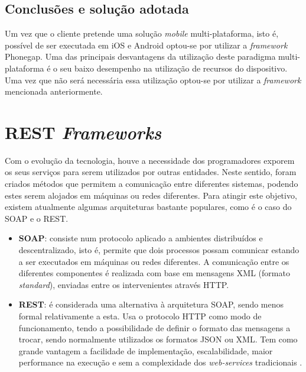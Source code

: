 \subsection{Conclusões e solução adotada}



Um vez que o cliente pretende uma solução \textit{mobile} multi-plataforma, isto é, possível de ser executada em iOS e Android optou-se por utilizar a \textit{framework} Phonegap.  Uma das principais desvantagens da utilização deste paradigma multi-plataforma é o seu baixo desempenho na utilização de recursos do dispositivo. Uma vez que não será necessária essa utilização optou-se por utilizar a \textit{framework} mencionada anteriormente. 



\newpage
\section{REST \textit{Frameworks}}


Com o evolução da tecnologia, houve a necessidade dos programadores exporem os seus serviços para serem utilizados por outras entidades. Neste sentido, foram criados métodos que permitem a comunicação  entre diferentes sistemas, podendo estes serem alojados em máquinas ou redes diferentes. Para atingir este objetivo, existem atualmente algumas arquiteturas bastante populares, como é o caso do \ac{SOAP} e o \ac{REST}. 


\begin{itemize}
	\item \textbf{\ac{SOAP}}: consiste num protocolo aplicado a ambientes distribuídos e descentralizado, isto é, permite que dois processos possam comunicar estando a ser executados em máquinas ou redes diferentes\cite{Kang2015}. A comunicação entre os diferentes componentes é realizada com base em mensagens \ac{XML} (formato \textit{standard}), enviadas entre os intervenientes através \ac{HTTP}.
	
	
	\item \textbf{\ac{REST}}: é considerada uma alternativa à arquitetura \ac{SOAP}, sendo menos formal relativamente a esta. Usa o protocolo \ac{HTTP} como modo de funcionamento, tendo a possibilidade de definir o formato das mensagens a trocar, sendo normalmente utilizados os formatos \ac{JSON} ou \ac{XML}. Tem como grande vantagem a facilidade de implementação, escalabilidade, maior performance na execução e sem a complexidade dos \textit{web-services} tradicionais \cite{restpaper}. 
	
	
\end{itemize}

